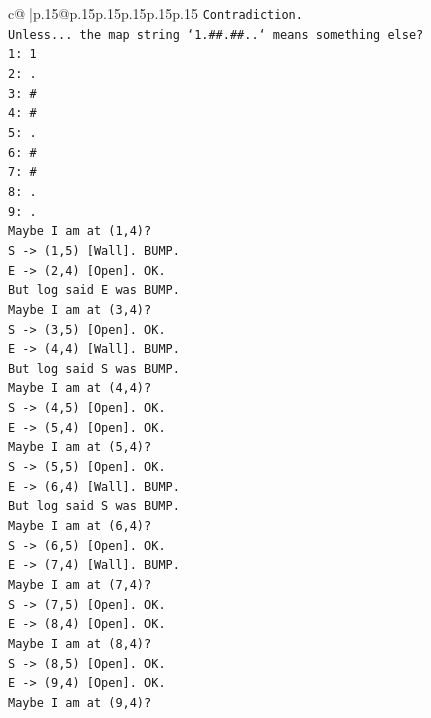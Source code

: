 \documentclass{article}
\begin{document}
{\begin{supertabular}{c@{$\;$}|p{.15\linewidth}@{}p{.15\linewidth}p{.15\linewidth}p{.15\linewidth}p{.15\linewidth}p{.15\linewidth}}
{{{\texttt{Contradiction.} \\
\texttt{Unless... the map string `1.\#\#.\#\#..` means something else?} \\
\texttt{1: 1} \\
\texttt{2: .} \\
\texttt{3: \#} \\
\texttt{4: \#} \\
\texttt{5: .} \\
\texttt{6: \#} \\
\texttt{7: \#} \\
\texttt{8: .} \\
\texttt{9: .} \\
\texttt{Maybe I am at (1,4)?} \\
\texttt{S {-}> (1,5) {[}Wall{]}. BUMP.} \\
\texttt{E {-}> (2,4) {[}Open{]}. OK.} \\
\texttt{But log said E was BUMP.} \\
\texttt{Maybe I am at (3,4)?} \\
\texttt{S {-}> (3,5) {[}Open{]}. OK.} \\
\texttt{E {-}> (4,4) {[}Wall{]}. BUMP.} \\
\texttt{But log said S was BUMP.} \\
\texttt{Maybe I am at (4,4)?} \\
\texttt{S {-}> (4,5) {[}Open{]}. OK.} \\
\texttt{E {-}> (5,4) {[}Open{]}. OK.} \\
\texttt{Maybe I am at (5,4)?} \\
\texttt{S {-}> (5,5) {[}Open{]}. OK.} \\
\texttt{E {-}> (6,4) {[}Wall{]}. BUMP.} \\
\texttt{But log said S was BUMP.} \\
\texttt{Maybe I am at (6,4)?} \\
\texttt{S {-}> (6,5) {[}Open{]}. OK.} \\
\texttt{E {-}> (7,4) {[}Wall{]}. BUMP.} \\
\texttt{Maybe I am at (7,4)?} \\
\texttt{S {-}> (7,5) {[}Open{]}. OK.} \\
\texttt{E {-}> (8,4) {[}Open{]}. OK.} \\
\texttt{Maybe I am at (8,4)?} \\
\texttt{S {-}> (8,5) {[}Open{]}. OK.} \\
\texttt{E {-}> (9,4) {[}Open{]}. OK.} \\
\texttt{Maybe I am at (9,4)?} \\
}}}
\end{supertabular}}
\end{document}
